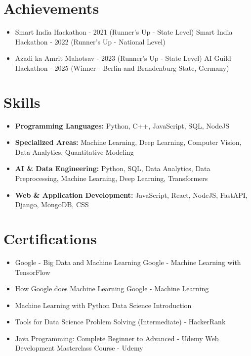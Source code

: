 \documentclass[a4paper,10pt]{article}
\begin{document}
\section*{Achievements}
\begin{itemize}
\item Smart India Hackathon - 2021 (Runner's Up - State Level) \hfill Smart India Hackathon - 2022 (Runner's Up - National Level)
\item Azadi ka Amrit Mahotsav - 2023 (Runner's Up - State Level) \hfill AI Guild Hackathon - 2025 (Winner - Berlin and Brandenburg State, Germany)
\end{itemize}

\section*{Skills}
\begin{itemize}
  \item \textbf{Programming Languages:} Python, C++, JavaScript, SQL, NodeJS
  \item \textbf{Specialized Areas:} Machine Learning, Deep Learning, Computer Vision, Data Analytics, Quantitative Modeling
  \item \textbf{AI \& Data Engineering:} Python, SQL, Data Analytics, Data Preprocessing, Machine Learning, Deep Learning, Transformers
  \item \textbf{Web \& Application Development:} JavaScript, React, NodeJS, FastAPI, Django, MongoDB, CSS
\end{itemize}

\section*{Certifications}
\begin{itemize}
\item Google - Big Data and Machine Learning \hfill Google - Machine Learning with TensorFlow
\item How Google does Machine Learning \hfill Google - Machine Learning
\item Machine Learning with Python \hfill Data Science Introduction
\item Tools for Data Science \hfill Problem Solving (Intermediate) - HackerRank
\item Java Programming: Complete Beginner to Advanced - Udemy \hfill Web Development Masterclass Course - Udemy
\end{itemize}
\end{document}
